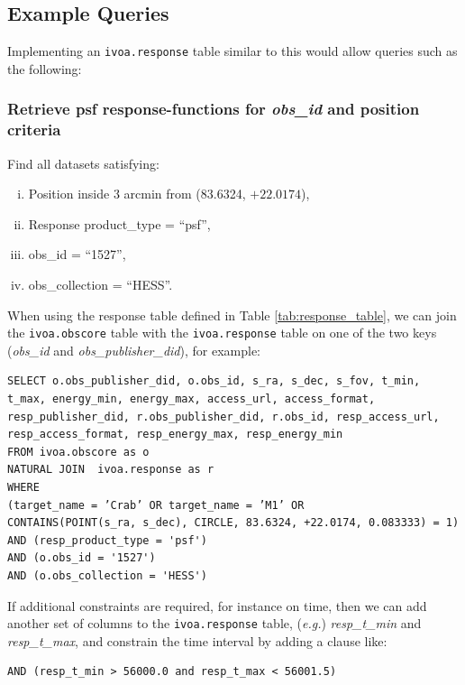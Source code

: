 \subsection*{Example Queries}
\noindent Implementing an {\tt ivoa.response} table similar to this would allow queries such as the following:
\subsubsection*{Retrieve {\bf psf} {\bf response-function}s for {\em obs\_id\/} and position criteria}
\noindent Find all datasets satisfying:
\begin{enumerate}[(i)]
 \item Position inside 3 arcmin from (83.6324, $+22.0174$),
 \item Response product\_type = ``psf'',
 \item obs\_id = ``1527'',
 \item obs\_collection = ``HESS''.
\end{enumerate}

When using the response table defined in Table \ref{tab:response_table}, we can join the {\tt ivoa.obscore} table with the {\tt ivoa.response} table on one of the two keys ({\em obs\_id\/} and {\em obs\_publisher\_did\/}), for example: 
{\small
\begin{verbatim}
SELECT o.obs_publisher_did, o.obs_id, s_ra, s_dec, s_fov, t_min,
t_max, energy_min, energy_max, access_url, access_format, 
resp_publisher_did, r.obs_publisher_did, r.obs_id, resp_access_url,
resp_access_format, resp_energy_max, resp_energy_min
FROM ivoa.obscore as o
NATURAL JOIN  ivoa.response as r
WHERE
(target_name = ’Crab’ OR target_name = ’M1’ OR
CONTAINS(POINT(s_ra, s_dec), CIRCLE, 83.6324, +22.0174, 0.083333) = 1)
AND (resp_product_type = 'psf')
AND (o.obs_id = '1527')
AND (o.obs_collection = 'HESS')
\end{verbatim}
}
If additional constraints are required, for instance on time, then we can add another set of columns to the {\tt ivoa.response} table, ({\em e.g.\/}\null) {\em resp\_t\_min\/} and {\em resp\_t\_max\/}, and constrain the time interval by adding a clause like:
{\small
\begin{verbatim}
AND (resp_t_min > 56000.0 and resp_t_max < 56001.5)
\end{verbatim}
}

